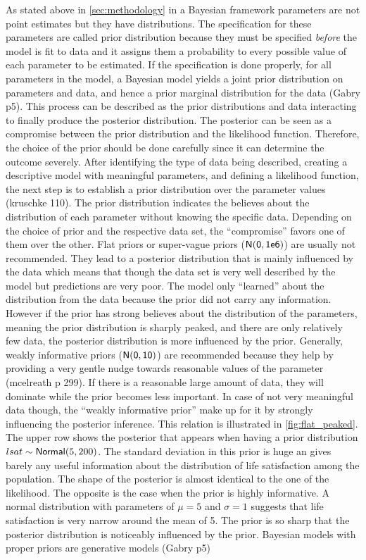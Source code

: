 \documentclass[a4, 12pt]{article}
\begin{document}
\label{subsec:priors}
As stated above in \ref{sec:methodology} in a Bayesian framework parameters are not point estimates but they have distributions. The specification for these parameters are called prior distribution because they must be specified \emph{before} the model is fit to data and it assigns them a probability to every possible value of each parameter to be estimated. If the specification is done properly, for all parameters in the model, a Bayesian model yields a joint prior distribution on parameters and data, and hence a prior marginal distribution for the data (Gabry p5). This process can be described as the prior distributions and data interacting to finally produce the posterior distribution. The posterior can be seen as a compromise between the prior distribution and the likelihood function. Therefore, the choice of the prior should be done carefully since it can determine the outcome severely. After identifying the type of data being described, creating a descriptive model with meaningful parameters, and defining a likelihood function, the next step is to establish a prior distribution over the parameter values (kruschke 110). The prior distribution indicates the believes about the distribution of each parameter without knowing the specific data. Depending on the choice of prior and the respective data set, the ``compromise'' favors one of them over the other. Flat priors or super-vague priors (\(\sf {N}(0,1e6)\)) are usually not recommended. They lead to a posterior distribution that is mainly influenced by the data which means that though the data set is very well described by the model but predictions are very poor. The model only ``learned'' about the distribution from the data because the prior did not carry any information. However if the prior has strong believes about the distribution of the parameters, meaning the prior distribution is sharply peaked, and there are only relatively few data, the posterior distribution is more influenced by the prior. Generally, weakly informative priors (\(\sf{N}(0,10)\)) are recommended because they help by providing a very gentle nudge towards reasonable values of the parameter (mcelreath p 299). If there is a reasonable large amount of data, they will dominate while the prior becomes less important. In case of not very meaningful data though, the ``weakly informative prior'' make up for it by strongly influencing the posterior inference. This relation is illustrated in \ref{fig:flat_peaked}. The upper row shows the posterior that appears when having a prior distribution \(lsat \sim {\sf Normal}(5, 200)\). The standard deviation in this prior is huge an gives barely any useful information about the distribution of life satisfaction among the population. The shape of the posterior is almost identical to the one of the likelihood. The opposite is the case when the prior is highly informative. A normal distribution with parameters of \(\mu = 5\) and \(\sigma = 1\) suggests that life satisfaction is very narrow around the mean of 5. The prior is so sharp that the posterior distribution is noticeably influenced by the prior. Bayesian models with proper priors are generative models (Gabry p5)
\end{document}
